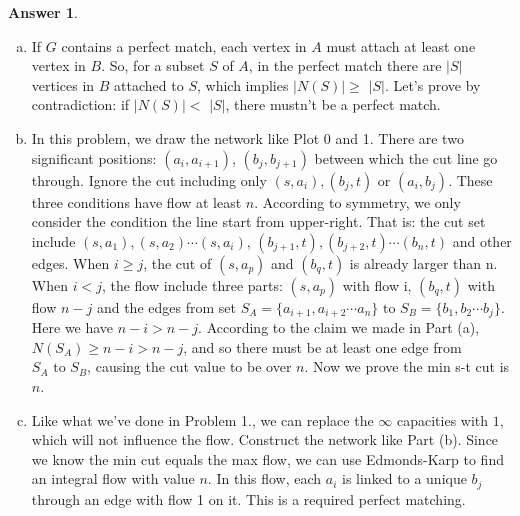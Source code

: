 \documentclass{article}
\theoremstyle{definition}
\newtheorem{ans}{Answer}
\begin{document}
	\begin{ans}
		~
		
		\begin{enumerate}[(a)]
			\item If $G$ contains a perfect match, each vertex in $A$ must attach at least one vertex in $B$. So, for a subset $S$ of $A$, in the perfect match there are $|S|$ vertices in $B$ attached to $S$, which implies $|N(S)| \geq$ $|S|$. Let's prove by contradiction: if $|N(S)| <$ $|S|$, there mustn't be a perfect match.
			\item In this problem, we draw the network like Plot 0 and 1. There are two significant positions: $(a_i, a_{i+1})$, $(b_j, b_{j+1})$ between which the cut line go through. Ignore the cut including only $(s, a_i), (b_j, t) \text{ or }(a_i, b_j)$. These three conditions have flow at least $n$. According to symmetry, we only consider the condition the line start from upper-right. That is: the cut set include $(s, a_1), (s, a_2)\cdots (s, a_i)$, $(b_{j+1}, t), (b_{j+2}, t)\cdots (b_n, t)$ and other edges. When $i\geq j$, the cut of $(s, a_p)$ and $(b_q, t)$ is already larger than n. When $i<j$, the flow include three parts: $(s, a_p)$ with flow i, $(b_q, t)$ with flow $n-j$ and the edges from set $S_A=\{a_{i+1}, a_{i+2}\cdots a_{n}\}\text{ to }S_B=\{b_{1}, b_{2}\cdots b_{j}\}$. Here we have $n-i>n-j$. According to the claim we made in Part (a), $N(S_A)\geq n-i>n-j$, and so there must be at least one edge from $S_A \text{ to } S_B$, causing the cut value to be over $n$. Now we prove the min s-t cut is $n$. 
			\item Like what we've done in Problem 1., we can replace the $\infty$ capacities with $1$, which will not influence the flow. Construct the network like Part (b). Since we know the min cut equals the max flow, we can use Edmonds-Karp to find an integral flow with value $n$. In this flow, each $a_i$ is linked to a unique $b_j$ through an edge with flow 1 on it. This is a required perfect matching.
		\end{enumerate}
	\end{ans}
	
\end{document}
